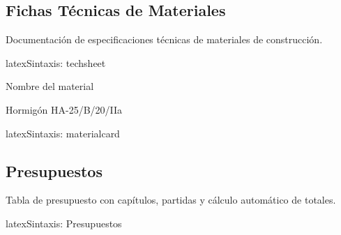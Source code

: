 \subsection{Fichas Técnicas de Materiales}
\label{subsec:fichas-tecnicas}

Documentación de especificaciones técnicas de materiales de construcción.


\begin{codigosimple}{latex}{Sintaxis: techsheet}
\begin{techsheet}{Nombre del material}
\end{techsheet}
\end{codigosimple}

\begin{techsheet}{Hormigón HA-25/B/20/IIa}
\end{techsheet}


\begin{codigosimple}{latex}{Sintaxis: materialcard}
\end{codigosimple}

\vspace{1em}
\noindent
{}
\hfill
{}

\subsection{Presupuestos}
\label{subsec:presupuesto}

Tabla de presupuesto con capítulos, partidas y cálculo automático de totales.

\begin{codigosimple}{latex}{Sintaxis: Presupuestos}
\begin{presupuesto}
\end{presupuesto}
\end{codigosimple}

